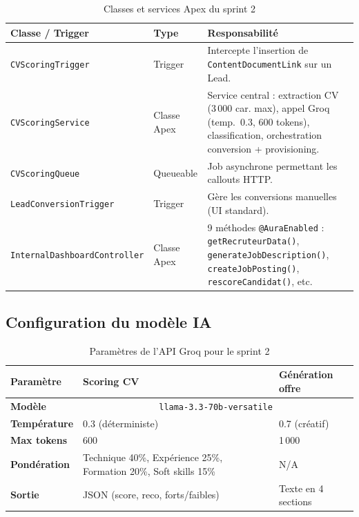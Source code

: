 \begin{longtable}{|p{4.5cm}|p{2.5cm}|p{7.5cm}|}
\caption{Classes et services Apex du sprint 2} \label{tab:apex_sprint2} \\
\hline
\rowcolor{gray!20} \textbf{Classe / Trigger} & \textbf{Type} & \textbf{Responsabilité} \\
\hline
\endfirsthead
\endhead

\texttt{CVScoringTrigger} & Trigger & Intercepte l'insertion de \texttt{ContentDocumentLink} sur un Lead. \\
\hline
\texttt{CVScoringService} & Classe Apex & Service central : extraction CV (3\,000 car. max), appel Groq (temp.~0.3, 600 tokens), classification, orchestration conversion + provisioning. \\
\hline
\texttt{CVScoringQueue} & Queueable & Job asynchrone permettant les callouts HTTP. \\
\hline
\texttt{LeadConversion\-Trigger} & Trigger & Gère les conversions manuelles (UI standard). \\
\hline
\texttt{InternalDashboard\-Controller} & Classe Apex & 9 méthodes \texttt{@AuraEnabled} : \texttt{getRecruteurData()}, \texttt{generateJobDescription()}, \texttt{createJobPosting()}, \texttt{rescoreCandidat()}, etc. \\
\hline
\end{longtable}
\FloatBarrier

\subsection{Configuration du modèle IA}

\begin{table}[hbt!]
\centering
\renewcommand{\arraystretch}{1.3}
\begin{tabular}{|p{4cm}|p{5cm}|p{5cm}|}
\hline
\rowcolor{gray!15} \textbf{Paramètre} & \textbf{Scoring CV} & \textbf{Génération offre} \\
\hline
\textbf{Modèle} & \multicolumn{2}{c|}{\texttt{llama-3.3-70b-versatile}} \\
\hline
\textbf{Température} & 0.3 (déterministe) & 0.7 (créatif) \\
\hline
\textbf{Max tokens} & 600 & 1\,000 \\
\hline
\textbf{Pondération} & Technique 40\%, Expérience 25\%, Formation 20\%, Soft skills 15\% & N/A \\
\hline
\textbf{Sortie} & JSON (score, reco, forts/faibles) & Texte en 4 sections \\
\hline
\end{tabular}
\caption{Paramètres de l'API Groq pour le sprint 2}
\label{tab:ia_config}
\end{table}
\FloatBarrier


